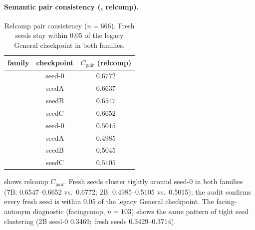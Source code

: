 \paragraph{Semantic pair consistency (\dC{}, relcomp).}
\begin{table}[t]
\centering
\small
\begin{tabular}{lcc}
\toprule
family & checkpoint & $C_{\text{pair}}$ (relcomp) \\
\midrule
\qwen{} & seed-0 & $0.6772$ \\
\qwen{} & seedA & $0.6637$ \\
\qwen{} & seedB & $0.6547$ \\
\qwen{} & seedC & $0.6652$ \\
\smol{} & seed-0 & $0.5015$ \\
\smol{} & seedA & $0.4985$ \\
\smol{} & seedB & $0.5045$ \\
\smol{} & seedC & $0.5105$ \\
\bottomrule
\end{tabular}
\caption{Relcomp pair consistency ($n=666$). Fresh seeds stay within 0.05
of the legacy General checkpoint in both families.}
\label{tab:relcomp}
\end{table}

 shows relcomp $C_{\text{pair}}$. Fresh seeds cluster
tightly around seed-0 in both families (7B: 0.6547--0.6652 vs.\ 0.6772; 2B:
0.4985--0.5105 vs.\ 0.5015); the audit confirms every fresh seed is within
0.05 of the legacy General checkpoint. The facing-antonym diagnostic
(facingcomp, $n=103$) shows the same pattern of tight seed clustering
(2B seed-0 0.3469; fresh seeds 0.3429--0.3714).

